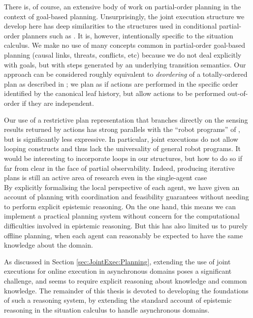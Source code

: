 There is, of course, an extensive body of work on partial-order planning
in the context of goal-based planning. Unsurprisingly, the joint execution
structure we develop here has deep similarities to the structures
used in conditional partial-order planners such as \citep{peot92conditional_nonlinear}.
It is, however, intentionally specific to the situation calculus.
We make no use of many concepts common in partial-order goal-based
planning (causal links, threats, conflicts, etc) because we do not
deal explicitly with goals, but with steps generated by an underlying
transition semantics. Our approach can be considered roughly equivalent
to \emph{deordering} of a totally-ordered plan as described in \citep{backstrom99reordering};
we plan as if actions are performed in the specific order identified
by the canonical leaf history, but allow actions to be performed out-of-order
if they are independent.

Our use of a restrictive plan representation that branches directly
on the sensing results returned by actions has strong parallels with
the {}``robot programs'' of \citep{levesque96what_is_planning,levesque98what_robots_can_do},
but is significantly less expressive. In particular, joint executions
do not allow looping constructs and thus lack the universality of
general robot programs. It would be interesting to incorporate loops
in our structures, but how to do so if far from clear in the face
of partial observability. Indeed, producing iterative plans is still
an active area of research even in the single-agent case \citep{levesque05planning_with_loops}\\


By explicitly formalising the local perspective of each agent, we
have given an account of planning with coordination and feasibility
guarantees without needing to perform explicit epistemic reasoning.
On the one hand, this means we can implement a practical planning
system without concern for the computational difficulties involved
in epistemic reasoning. But this has also limited us to purely offline
planning, when each agent can reasonably be expected to have the same
knowledge about the domain.

As discussed in Section \ref{sec:JointExec:Planning}, extending the
use of joint executions for online execution in asynchronous domains
poses a significant challenge, and seems to require explicit reasoning
about knowledge and common knowledge. The remainder of this thesis
is devoted to developing the foundations of such a reasoning system,
by extending the standard account of epistemic reasoning in the situation
calculus to handle asynchronous domains.

